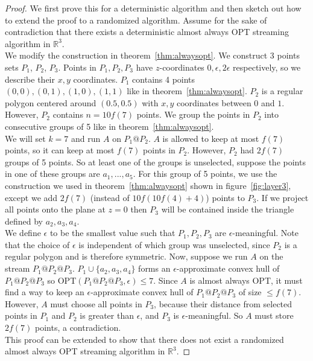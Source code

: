 \begin{proof}
We first prove this for a deterministic algorithm and then sketch out how to extend the proof to a randomized algorithm. Assume for the sake of contradiction that there exists a deterministic almost always OPT streaming algorithm in $\mathbb{R}^3$.
\\

We modify the construction in theorem~\ref{thm:alwaysopt}. We construct 3 points sets $P_1$, $P_2$, $P_3$. Points in $P_1, P_2, P_3$ have $z$-coordinates $0, \epsilon, 2\epsilon$ respectively, so we describe their $x, y$ coordinates. $P_1$ contains 4 points $(0,0), (0,1), (1,0), (1,1)$ like in theorem~\ref{thm:alwaysopt}. $P_2$ is a regular polygon centered around $(0.5, 0.5)$ with $x, y$ coordinates between $0$ and $1$. However, $P_2$ contains $n = 10f(7)$ points. We group the points in $P_2$ into consecutive groups of 5 like in theorem~\ref{thm:alwaysopt}.
\\

We will set $k=7$ and run $A$ on $P_1 @ P_2$. $A$ is allowed to keep at most $f(7)$ points, so it can keep at most $f(7)$ points in $P_2$. However, $P_2$ had $2f(7)$ groups of 5 points. So at least one of the groups is unselected, suppose the points in one of these groups are $a_1, ..., a_5$. For this group of 5 points, we use the construction we used in theorem~\ref{thm:alwaysopt} shown in figure~\ref{fig:layer3}, except we add $2f(7)$ (instead of $10f(10f(4) + 4)$) points to $P_3$. If we project all points onto the plane at $z = 0$ then $P_3$ will be contained inside the triangle defined by $a_2, a_3, a_4$.
\\

We define $\epsilon$ to be the smallest value such that $P_1, P_2, P_3$ are $\epsilon$-meaningful. Note that the choice of $\epsilon$ is independent of which group was unselected, since $P_2$ is a regular polygon and is therefore symmetric. Now, suppose we run $A$ on the stream $P_1 @ P_2 @ P_3$. $P_1 \cup \{ a_2, a_3, a_4 \}$ forms an $\epsilon$-approximate convex hull of $P_1 @ P_2 @ P_3$ so OPT$(P_1 @ P_2 @ P_3, \epsilon) \leq 7$. Since $A$ is almost always OPT, it must find a way to keep an $\epsilon$-approximate convex hull of $P_1 @ P_2 @ P_3$ of size $\leq f(7)$. However, $A$ must choose all points in $P_3$, because their distance from selected points in $P_1$ and $P_2$ is greater than $\epsilon$, and $P_3$ is $\epsilon$-meaningful. So $A$ must store $2f(7)$ points, a contradiction.
\\

This proof can be extended to show that there does not exist a randomized almost always OPT streaming algorithm in $\mathbb{R}^3$.
\end{proof}

